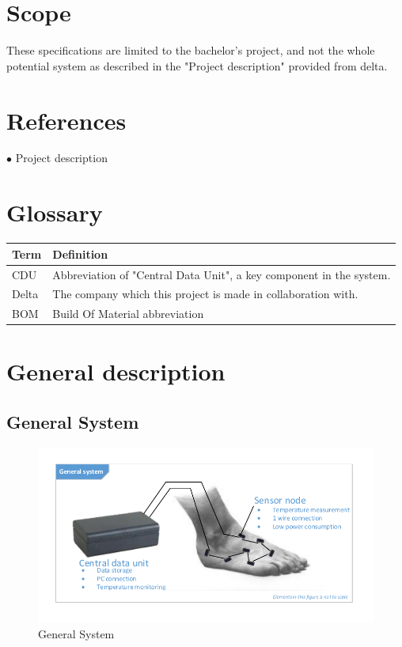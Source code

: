 \section{Scope}
These specifications are limited to the bachelor's project, and not the whole potential system as described in the "Project description" provided from delta.\\

\section{References}
$\bullet$ Project description

\section{Glossary}
\begin{table}[H]
\centering
\begin{tabular}{|p{4cm}|p{7cm}|}
\hline
Term & Definition\\ \hline
CDU & Abbreviation of "Central Data Unit", a key component in the system. \\ \hline
Delta & The company which this project is made in collaboration with.\\ \hline
BOM & Build Of Material abbreviation\\ \hline
\end{tabular}
\end{table}

\section{General description}

\subsection{General System}
\begin{figure}[H]
	\centering
	\includegraphics[width=1\textwidth]{billeder/GeneralSystem}
	\caption{General System}
\end{figure}

